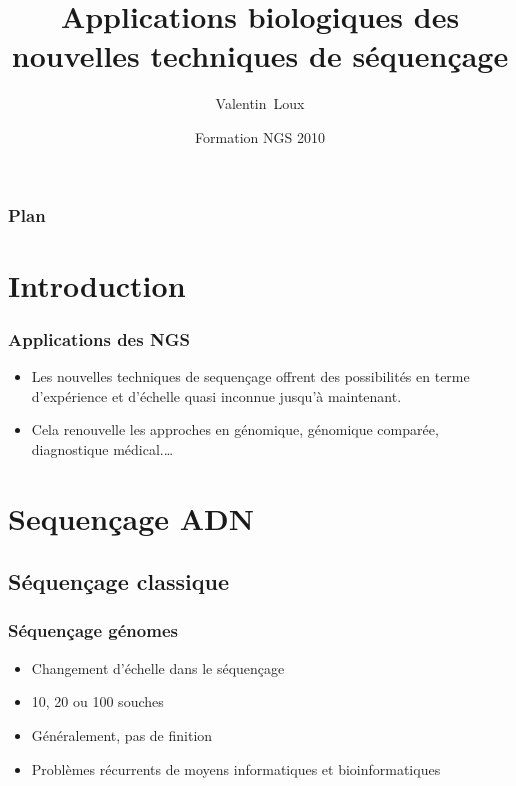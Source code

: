 \documentclass{beamer}
\title[Applications NGS] %
{Applications biologiques des nouvelles techniques de séquençage}
\author[V. Loux] %
{Valentin~Loux}
\institute[INRA-MIG] %
{
  Unité Mathématique, Informatique et Génome\\
  INRA, Jouy en Josas
}
\date[2 Novembre 2010] %
{Formation NGS 2010}
\begin{document}
	
	
\begin{frame}
  \titlepage
\end{frame}

\begin{frame}
  \frametitle{Plan}
  \tableofcontents
\end{frame}


\section{Introduction}

\begin{frame}
  \frametitle{Applications des NGS}
	\begin{itemize}
		\item Les nouvelles techniques de sequençage offrent des possibilités en terme d'expérience et d'échelle quasi inconnue jusqu'à maintenant.
		\item	Cela renouvelle les approches en génomique, génomique comparée, diagnostique médical.\ldots
	\end{itemize}
\end{frame}


\section{Sequençage ADN} %
\label{sec:sequençage_resequençage_massif}



\subsection{Séquençage classique} %
\label{sub:séquençage_classique_}



\begin{frame}
	\frametitle{Séquençage génomes}
\begin{itemize}
	\item Changement d'échelle dans le séquençage
	\item 10, 20 ou 100 souches
	\item Généralement, pas de finition
	\item Problèmes récurrents de moyens informatiques et bioinformatiques
\end{itemize}
\end{frame}
\end{document}
